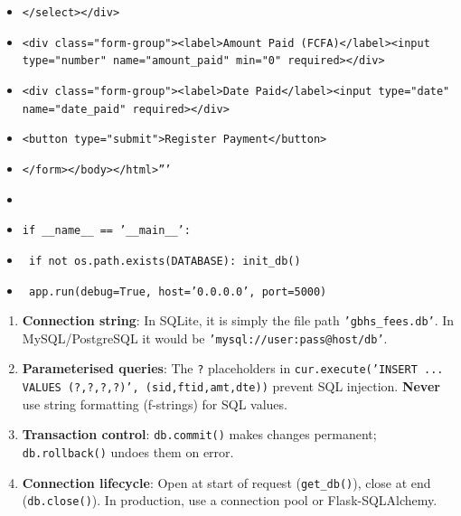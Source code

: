 \documentclass[11pt]{article}
\begin{document}
\begin{methode}
\begin{itemize}
    \item \texttt{</select></div>}
    \item \texttt{<div class="form-group"><label>Amount Paid (FCFA)</label><input type="number" name="amount\_paid" min="0" required></div>}
    \item \texttt{<div class="form-group"><label>Date Paid</label><input type="date" name="date\_paid" required></div>}
    \item \texttt{<button type="submit">Register Payment</button>}
    \item \texttt{</form></body></html>'''}
    \item \texttt{}
    \item \texttt{if \_\_name\_\_ == '\_\_main\_\_':}
    \item \texttt{    if not os.path.exists(DATABASE): init\_db()}
    \item \texttt{    app.run(debug=True, host='0.0.0.0', port=5000)}
\end{itemize}
\end{methode}

\begin{aretenir}
\begin{enumerate}
    \item \textbf{Connection string}: In SQLite, it is simply the file path \texttt{'gbhs\_fees.db'}. In MySQL/PostgreSQL it would be \texttt{'mysql://user:pass@host/db'}.
    \item \textbf{Parameterised queries}: The \texttt{?} placeholders in \texttt{cur.execute('INSERT ... VALUES (?,?,?,?)', (sid,ftid,amt,dte))} prevent SQL injection. \textbf{Never} use string formatting (f-strings) for SQL values.
    \item \textbf{Transaction control}: \texttt{db.commit()} makes changes permanent; \texttt{db.rollback()} undoes them on error.
    \item \textbf{Connection lifecycle}: Open at start of request (\texttt{get\_db()}), close at end (\texttt{db.close()}). In production, use a connection pool or Flask-SQLAlchemy.
\end{enumerate}
\end{aretenir}
\end{document}
